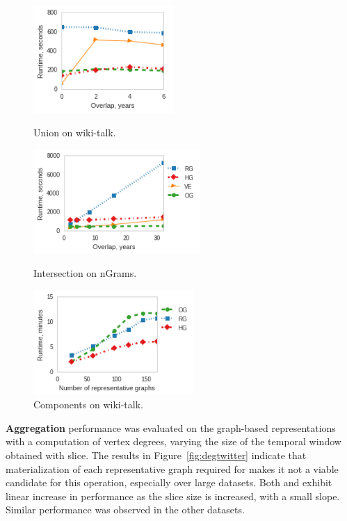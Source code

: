 \begin{figure}[t]
\begin{minipage}{2.1in}
\centering
\includegraphics[width=2.1in]{figs/union_wikitalk_build13.png}
\vspace{-0.2in}
\caption{Union on wiki-talk.}
\label{fig:union1}
\vspace{-0.1in}
\end{minipage}
\begin{minipage}{2.2in}
\centering
\includegraphics[width=2.5in]{figs/intersect_ngrams_build13.png}
\vspace{-0.2in}
\caption{Intersection on nGrams.}
\label{fig:intersectngrams}
\vspace{-0.1in}
\end{minipage}
\begin{minipage}{2.2in}
\centering
\includegraphics[width=2.4in]{figs/cc_wikitalk_build13.png}
\vspace{-0.2in}
\caption{Components on wiki-talk.}
\label{fig:ccwiki}
\vspace{-0.1in}
\end{minipage}
\end{figure}

{\bf Aggregation} performance was evaluated on the graph-based
representations with a computation of vertex degrees, varying the size
of the temporal window obtained with slice.  The results in
Figure~\ref{fig:degtwitter} indicate that materialization of each
representative graph required for \sg makes it not a viable candidate
for this operation, especially over large datasets.  Both \og and \hg
exhibit linear increase in performance as the slice size is increased,
with a small slope.  Similar performance was observed in the other
datasets.

